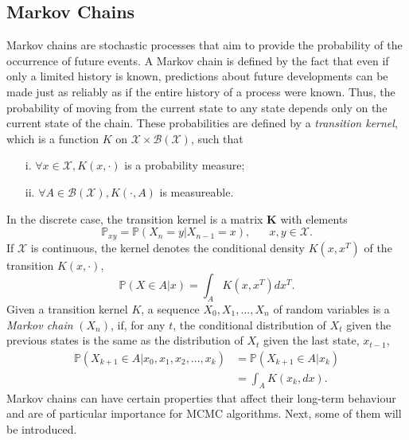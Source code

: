\subsection{Markov Chains}
Markov chains are stochastic processes that aim to provide the probability of the occurrence of future events. A Markov chain is defined by the fact that even if only a limited history is known, predictions about future developments can be made just as reliably as if the entire history of a process were known. Thus, the probability of moving from the current state to any state depends only on the current state of the chain. These probabilities are defined by a \textit{transition kernel}, which is a function $K$ on $\mathcal{X} \times \mathcal{B}\left(\mathcal{X}\right)$, such that
\begin{itemize}
    \item[i.] $\forall x\in\mathcal{X}, K\left(x, \cdot\right)$ is a probability measure;
    \item[ii.] $\forall A\in \mathcal{B}\left(\mathcal{X}\right), K\left(\cdot, A\right)$ is measureable.
\end{itemize}
In the discrete case, the transition kernel is a matrix $\pmb{K}$ with elements
\begin{equation*}
    \mathbb{P}_{xy}=\mathbb{P}\left(X_n=y|X_{n-1}=x\right), \hspace{20pt}x,y\in\mathcal{X}.
\end{equation*}
If $\mathcal{X}$ is continuous, the kernel denotes the conditional density $K\left(x,x^T\right)$ of the transition $K\left(x,\cdot\right)$,
\begin{equation*}
    \mathbb{P}\left(X\in A|x\right)=\int_AK\left(x,x^T\right)dx^T.
\end{equation*}
Given a transition kernel $K$, a sequence $X_0,X_1,...,X_n$ of random variables is a \textit{Markov chain} $\left(X_n\right)$, if, for any $t$, the conditional distribution of $X_t$ given the previous states is the same as the distribution of $X_t$ given the last state, $x_{t-1}$,
\begin{align}
    \mathbb{P}\left(X_{k+1}\in A|x_0,x_1,x_2,...,x_k\right) &= \mathbb{P}\left(X_{k+1}\in A|x_k\right) \nonumber\\
    &= \int_A K\left(x_k, dx\right). 
\end{align}
Markov chains can have certain properties that affect their long-term behaviour and are of particular importance for MCMC algorithms. Next, some of them will be introduced.
